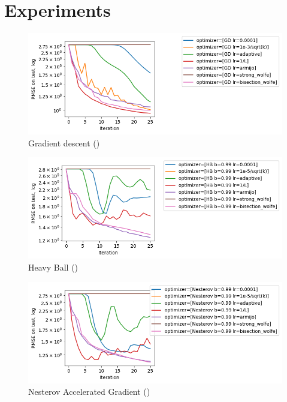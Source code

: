\documentclass{article}
\begin{document}
\section{Experiments}\label{sec:experiments}

\begin{figure}[H]
  \centering
  \includegraphics[width=\textwidth,keepaspectratio]{../data/gd.png}
  \caption[Gradient descent]{Gradient descent ()}\label{fig:gd}
\end{figure}

\begin{figure}[H]
  \centering
  \includegraphics[width=\textwidth,keepaspectratio]{../data/hb.png}
  \caption[Heavy Ball]{Heavy Ball ()}\label{fig:hb}
\end{figure}

\begin{figure}[H]
  \centering
  \includegraphics[width=\textwidth,keepaspectratio]{../data/Nesterov.png}
  \caption[Nesterov]{Nesterov Accelerated  Gradient ()}\label{fig:nesterov}
\end{figure}
\end{document}
